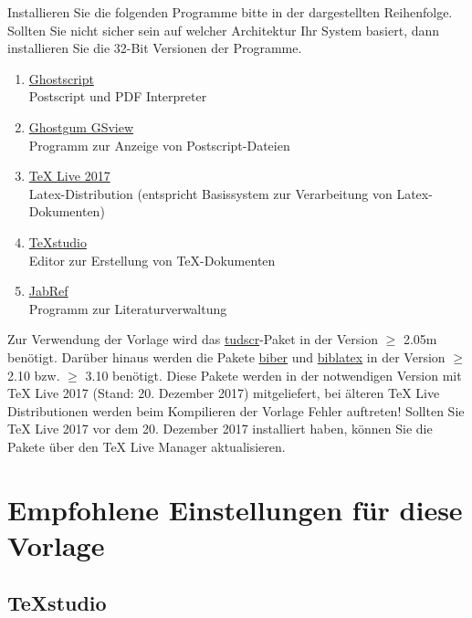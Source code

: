 \documentclass[final, english, ngerman, a4paper, 10pt, %
numbers=noenddot,
cd=true,
cdfont=false,cdfont=nohead,cdfont=nodin,
cdmath=false,
cdhead=false,
cdfoot=true,
cdcover=monochrome,
cdgeometry=symmetric,
declaration=heading,
declaration=notoc,
abstract=heading,
]{tudscrartcl}
\begin{document}
Installieren Sie die folgenden Programme bitte in der dargestellten Reihenfolge. Sollten Sie nicht sicher sein auf welcher Architektur Ihr System basiert, dann installieren Sie die 32-Bit Versionen der Programme.
\begin{enumerate}
\item \href{http://www.ghostscript.com/download/gsdnld.html}{Ghostscript}\\
Postscript und PDF Interpreter

\item \href{http://pages.cs.wisc.edu/~ghost/gsview/}{Ghostgum GSview}\\
Programm zur Anzeige von Postscript-Dateien

\item \href{http://www.tug.org/texlive/acquire-netinstall.html}{TeX Live 2017}\\
Latex-Distribution (entspricht Basissystem zur Verarbeitung von Latex-Dokumenten)

\item \href{http://texstudio.sourceforge.net/}{TeXstudio}\\
Editor zur Erstellung von TeX-Dokumenten

\item \href{http://jabref.sourceforge.net/}{JabRef}\\
Programm zur Literaturverwaltung
\end{enumerate}
Zur Verwendung der Vorlage wird das \href{https://www.ctan.org/pkg/tudscr?lang=en}{tudscr}-Paket in der Version $\geq$ 2.05m benötigt.  Darüber hinaus werden die Pakete \href{https://ctan.org/pkg/biber?lang=en}{biber} und \href{https://ctan.org/pkg/biblatex?lang=en}{biblatex} in der Version $\geq$ 2.10 bzw. $\geq$ 3.10 benötigt.
Diese Pakete werden in der notwendigen Version mit TeX Live 2017 (Stand: 20. Dezember 2017) mitgeliefert, bei älteren TeX Live Distributionen werden beim Kompilieren der Vorlage Fehler auftreten! Sollten Sie TeX Live 2017 vor dem 20. Dezember 2017 installiert haben, können Sie die Pakete über den TeX Live Manager aktualisieren.



\section{Empfohlene Einstellungen für diese Vorlage}

\subsection*{TeXstudio}
\end{document}
